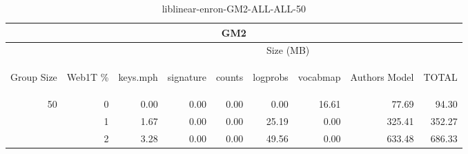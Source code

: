 \begin{center}
\begin{table}[htbp]
\begin{tabular}{ | r | r | r | r | r | r | r | r | r |}
\hline
\multicolumn{9}{|c|}{GM2}\\
\hline
 & & \multicolumn{7}{|c|}{Size (MB)}\\ \cline{3-9}
\begin{sideways}Group Size\end{sideways} & \begin{sideways}Web1T \% \end{sideways} & \begin{sideways}keys.mph\end{sideways} & \begin{sideways}signature\end{sideways} & \begin{sideways}counts\end{sideways} & \begin{sideways}logprobs\end{sideways} & \begin{sideways}vocabmap\end{sideways} & \begin{sideways}Authors Model \end{sideways} & \begin{sideways}TOTAL\end{sideways}\\
\hline
\multirow{2}{*}{50}
 & 0 & 0.00 & 0.00 & 0.00 & 0.00 & 16.61 & 77.69 & 94.30\\ \cline{2-9}
 & 1 & 1.67 & 0.00 & 0.00 & 25.19 & 0.00 & 325.41 & 352.27\\ \cline{2-9}
 & 2 & 3.28 & 0.00 & 0.00 & 49.56 & 0.00 & 633.48 & 686.33\\ \cline{2-9}
\hline
\end{tabular}
\caption{liblinear-enron-GM2-ALL-ALL-50}
\label{table:liblinear-enron-GM2-ALL-ALL-50}
\end{table}
\end{center}

